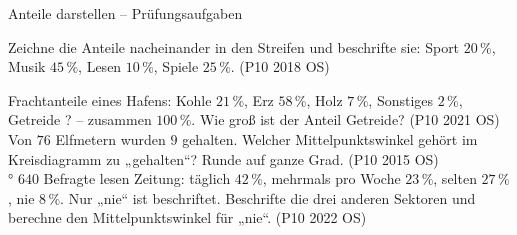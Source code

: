 \begin{aufgabe}{Anteile darstellen – Prüfungsaufgaben}
\begin{teile}
\teil Zeichne die Anteile nacheinander in den Streifen und beschrifte sie: Sport $20\,\%$, Musik $45\,\%$, Lesen $10\,\%$, Spiele $25\,\%$. \hfill (P10 2018 OS)

\streifenleer[0]
\teil Frachtanteile eines Hafens: Kohle $21\,\%$, Erz $58\,\%$, Holz $7\,\%$, Sonstiges $2\,\%$, Getreide ? – zusammen $100\,\%$. Wie groß ist der Anteil Getreide? \hfill (P10 2021 OS) \\ \leerfeld[\%]
\teil Von $76$ Elfmetern wurden $9$ gehalten. Welcher Mittelpunktswinkel gehört im Kreisdiagramm zu „gehalten“? Runde auf ganze Grad. \hfill (P10 2015 OS) \\ \leerfeld °
\teil $640$ Befragte lesen Zeitung: täglich $42\,\%$, mehrmals pro Woche $23\,\%$, selten $27\,\%$, nie $8\,\%$. Nur „nie“ ist beschriftet. Beschrifte die drei anderen Sektoren und berechne den Mittelpunktswinkel für „nie“. \hfill (P10 2022 OS)

\end{teile}
\end{aufgabe}

